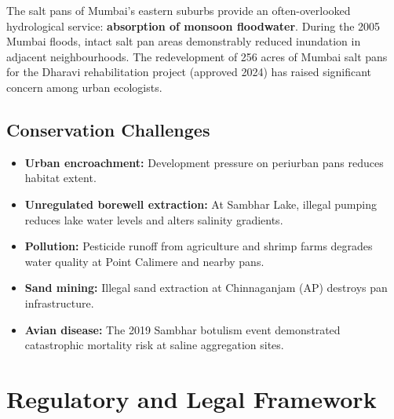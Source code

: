 \documentclass[12pt,a4paper]{article}
\begin{document}
The salt pans of Mumbai's eastern suburbs provide an often-overlooked hydrological
service: \textbf{absorption of monsoon floodwater}. During the 2005 Mumbai floods,
intact salt pan areas demonstrably reduced inundation in adjacent neighbourhoods.
The redevelopment of 256 acres of Mumbai salt pans for the Dharavi rehabilitation
project (approved 2024) has raised significant concern among urban ecologists.

\subsection{Conservation Challenges}

\begin{itemize}[leftmargin=*]
  \item \textbf{Urban encroachment:} Development pressure on periurban pans reduces
        habitat extent.
  \item \textbf{Unregulated borewell extraction:} At Sambhar Lake, illegal pumping
        reduces lake water levels and alters salinity gradients.
  \item \textbf{Pollution:} Pesticide runoff from agriculture and shrimp farms
        degrades water quality at Point Calimere and nearby pans.
  \item \textbf{Sand mining:} Illegal sand extraction at Chinnaganjam (AP) destroys
        pan infrastructure.
  \item \textbf{Avian disease:} The 2019 Sambhar botulism event demonstrated
        catastrophic mortality risk at saline aggregation sites.
\end{itemize}

\section{Regulatory and Legal Framework}
\end{document}
